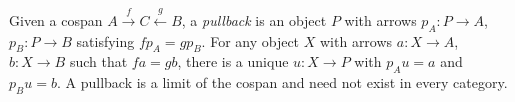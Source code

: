
Given a cospan $A\xrightarrow{f}C\xleftarrow{g}B$, a \emph{pullback} is an object $P$ with arrows $p_A:P\to A$, $p_B:P\to B$ satisfying $f p_A=g p_B$. For any object $X$ with arrows $a:X\to A$, $b:X\to B$ such that $fa=gb$, there is a unique $u:X\to P$ with $p_Au=a$ and $p_Bu=b$. A pullback is a limit of the cospan and need not exist in every category.
